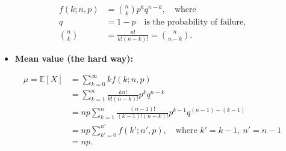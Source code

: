 \documentclass{article}
\begin{document}
\begin{align*}
    f(k;n,p) &= \binom{n}{k}p^k q^{n-k}, \quad \text{where} \\[0.8em]
    q &= 1-p \quad \text{is the probability of failure,} \\[0.8em]
    \binom{n}{k} &= \frac{n!}{k!(n-k)!} = \binom{n}{n-k}.
\end{align*}

\begin{itemize}
    \item \textbf{Mean value (the hard way):}
\end{itemize}

\begin{align*}
    \mu = \mathbb{E}[X]
    &= \sum_{k=0}^{\infty} k f(k;n,p) \\[0.8em]
    &= \sum_{k=1}^{n} \frac{k n!}{k!(n-k)!}p^k q^{n-k} \\[0.8em]
    &= np \sum_{k=1}^{n} \frac{(n-1)!}{(k-1)!(n-k)!}p^{k-1}q^{(n-1)-(k-1)} \\[0.8em]
    &= np \sum_{k'=0}^{n'} f(k';n',p), \quad \text{where } k'=k-1,\ n'=n-1 \\[0.8em]
    &= np.
\end{align*}
\end{document}
